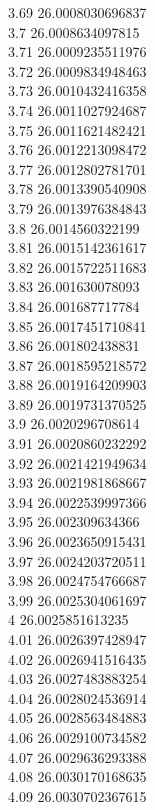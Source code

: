 {3.69	26.0008030696837\\
3.7	26.0008634097815\\
3.71	26.0009235511976\\
3.72	26.0009834948463\\
3.73	26.0010432416358\\
3.74	26.0011027924687\\
3.75	26.0011621482421\\
3.76	26.0012213098472\\
3.77	26.0012802781701\\
3.78	26.0013390540908\\
3.79	26.0013976384843\\
3.8	26.0014560322199\\
3.81	26.0015142361617\\
3.82	26.0015722511683\\
3.83	26.001630078093\\
3.84	26.001687717784\\
3.85	26.0017451710841\\
3.86	26.001802438831\\
3.87	26.0018595218572\\
3.88	26.0019164209903\\
3.89	26.0019731370525\\
3.9	26.0020296708614\\
3.91	26.0020860232292\\
3.92	26.0021421949634\\
3.93	26.0021981868667\\
3.94	26.0022539997366\\
3.95	26.002309634366\\
3.96	26.0023650915431\\
3.97	26.0024203720511\\
3.98	26.0024754766687\\
3.99	26.0025304061697\\
4	26.0025851613235\\
4.01	26.0026397428947\\
4.02	26.0026941516435\\
4.03	26.0027483883254\\
4.04	26.0028024536914\\
4.05	26.0028563484883\\
4.06	26.0029100734582\\
4.07	26.0029636293388\\
4.08	26.0030170168635\\
4.09	26.0030702367615\\
}
